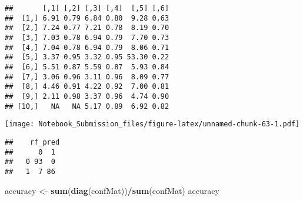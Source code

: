 \documentclass[
]{article}
\newenvironment{Shaded}{\begin{snugshade}}{\end{snugshade}}
\newcommand{\CommentTok}[1]{\textcolor[rgb]{0.56,0.35,0.01}{\textit{#1}}}
\newcommand{\DataTypeTok}[1]{\textcolor[rgb]{0.13,0.29,0.53}{#1}}
\newcommand{\DecValTok}[1]{\textcolor[rgb]{0.00,0.00,0.81}{#1}}
\newcommand{\KeywordTok}[1]{\textcolor[rgb]{0.13,0.29,0.53}{\textbf{#1}}}
\newcommand{\NormalTok}[1]{#1}
\newcommand{\OperatorTok}[1]{\textcolor[rgb]{0.81,0.36,0.00}{\textbf{#1}}}
\newcommand{\StringTok}[1]{\textcolor[rgb]{0.31,0.60,0.02}{#1}}
\begin{document}
\begin{verbatim}
##       [,1] [,2] [,3] [,4]  [,5] [,6]
##  [1,] 6.91 0.79 6.84 0.80  9.28 0.63
##  [2,] 7.24 0.77 7.21 0.78  8.19 0.70
##  [3,] 7.03 0.78 6.94 0.79  7.70 0.73
##  [4,] 7.04 0.78 6.94 0.79  8.06 0.71
##  [5,] 3.37 0.95 3.32 0.95 53.30 0.22
##  [6,] 5.51 0.87 5.59 0.87  5.93 0.84
##  [7,] 3.06 0.96 3.11 0.96  8.09 0.77
##  [8,] 4.46 0.91 4.22 0.92  7.00 0.81
##  [9,] 2.11 0.98 3.37 0.96  4.74 0.90
## [10,]   NA   NA 5.17 0.89  6.92 0.82
\end{verbatim}

\begin{Shaded}
\end{Shaded}

\texttt{[image: Notebook\_Submission\_files/figure-latex/unnamed-chunk-63-1.pdf]}

\begin{Shaded}
\end{Shaded}

\begin{verbatim}
##    rf_pred
##      0  1
##   0 93  0
##   1  7 86
\end{verbatim}

\begin{Shaded}
\begin{Highlighting}[]
\NormalTok{accuracy <-}\StringTok{ }\KeywordTok{sum}\NormalTok{(}\KeywordTok{diag}\NormalTok{(confMat))}\OperatorTok{/}\KeywordTok{sum}\NormalTok{(confMat)}
\NormalTok{accuracy}
\end{Highlighting}
\end{Shaded}
\end{document}
